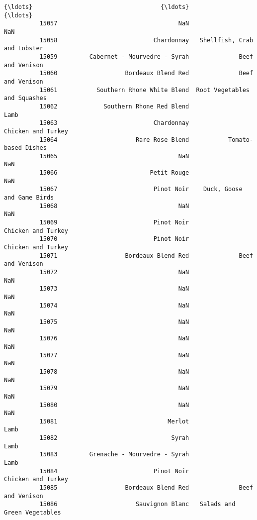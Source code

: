 \documentclass[11pt]{article}
\begin{document}
\begin{Verbatim}[commandchars=\\\{\}]
          {\ldots}                                    {\ldots}                           {\ldots}   
          15057                                  NaN                           NaN   
          15058                           Chardonnay   Shellfish, Crab and Lobster   
          15059         Cabernet - Mourvedre - Syrah              Beef and Venison   
          15060                   Bordeaux Blend Red              Beef and Venison   
          15061           Southern Rhone White Blend  Root Vegetables and Squashes   
          15062             Southern Rhone Red Blend                          Lamb   
          15063                           Chardonnay            Chicken and Turkey   
          15064                      Rare Rose Blend           Tomato-based Dishes   
          15065                                  NaN                           NaN   
          15066                          Petit Rouge                           NaN   
          15067                           Pinot Noir    Duck, Goose and Game Birds   
          15068                                  NaN                           NaN   
          15069                           Pinot Noir            Chicken and Turkey   
          15070                           Pinot Noir            Chicken and Turkey   
          15071                   Bordeaux Blend Red              Beef and Venison   
          15072                                  NaN                           NaN   
          15073                                  NaN                           NaN   
          15074                                  NaN                           NaN   
          15075                                  NaN                           NaN   
          15076                                  NaN                           NaN   
          15077                                  NaN                           NaN   
          15078                                  NaN                           NaN   
          15079                                  NaN                           NaN   
          15080                                  NaN                           NaN   
          15081                               Merlot                          Lamb   
          15082                                Syrah                          Lamb   
          15083         Grenache - Mourvedre - Syrah                          Lamb   
          15084                           Pinot Noir            Chicken and Turkey   
          15085                   Bordeaux Blend Red              Beef and Venison   
          15086                      Sauvignon Blanc   Salads and Green Vegetables   
          

\end{Verbatim}
\end{document}
